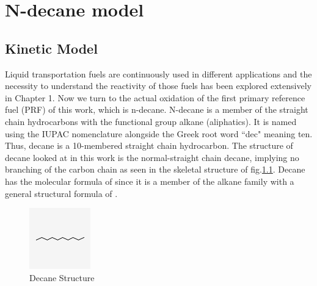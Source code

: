\chapter{N-decane model}
\section{Kinetic Model}


Liquid transportation fuels are continuously used in different applications and the necessity to understand the reactivity of those fuels has been explored extensively in Chapter 1. Now we turn to the actual oxidation of the first primary reference fuel (PRF) of this work, which is n-decane. N-decane is a member of the straight chain hydrocarbons with the functional group alkane (aliphatics). It is named using the IUPAC nomenclature alongside the Greek root word ``dec" meaning ten. Thus, decane is a 10-membered straight chain hydrocarbon. The structure of decane looked at in this work is the normal-straight chain decane, implying no branching of the carbon chain as seen in the skeletal structure of fig.\ref{fig:decane}. Decane has the molecular formula of  since it is a member of the alkane family with a general structural formula of . 

\begin{figure}
    \centering
    \includegraphics{images/Decane_100.png}
    \caption{Decane Structure}
    \label{fig:decane}
\end{figure}

\vspace{2.5cm}


